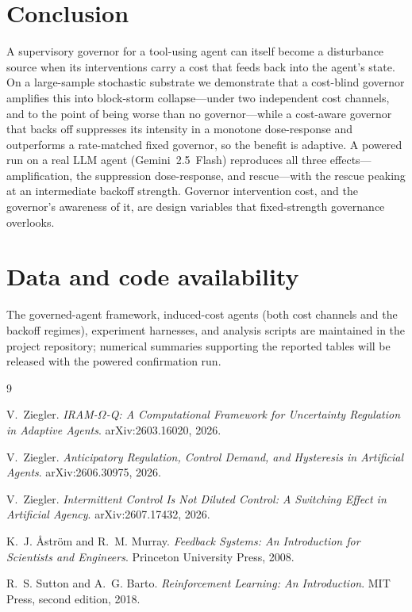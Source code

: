 \documentclass[11pt]{article}
\begin{document}
\section{Conclusion}

A supervisory governor for a tool-using agent can itself become a disturbance
source when its interventions carry a cost that feeds back into the agent's
state. On a large-sample stochastic substrate we demonstrate that a cost-blind
governor amplifies this into block-storm collapse---under two independent cost
channels, and to the point of being worse than no governor---while a cost-aware
governor that backs off suppresses its intensity in a monotone dose-response and
outperforms a rate-matched fixed governor, so the benefit is adaptive. A powered
run on a real LLM agent (Gemini~2.5~Flash) reproduces all three effects---%
amplification, the suppression dose-response, and rescue---with the rescue
peaking at an intermediate backoff strength. Governor intervention cost, and the
governor's awareness of it, are design variables that fixed-strength governance
overlooks.

\section*{Data and code availability}
The governed-agent framework, induced-cost agents (both cost channels and the
backoff regimes), experiment harnesses, and analysis scripts are maintained in
the project repository; numerical summaries supporting the reported tables will
be released with the powered confirmation run.

\begin{thebibliography}{9}

V.~Ziegler.
\newblock \emph{IRAM-$\Omega$-Q: A Computational Framework for Uncertainty
Regulation in Adaptive Agents}.
\newblock arXiv:2603.16020, 2026.

V.~Ziegler.
\newblock \emph{Anticipatory Regulation, Control Demand, and Hysteresis in
Artificial Agents}.
\newblock arXiv:2606.30975, 2026.

V.~Ziegler.
\newblock \emph{Intermittent Control Is Not Diluted Control: A Switching Effect
in Artificial Agency}.
\newblock arXiv:2607.17432, 2026.

K.~J. \r{A}str\"om and R.~M. Murray.
\newblock \emph{Feedback Systems: An Introduction for Scientists and Engineers}.
\newblock Princeton University Press, 2008.

R.~S. Sutton and A.~G. Barto.
\newblock \emph{Reinforcement Learning: An Introduction}.
\newblock MIT Press, second edition, 2018.

\end{thebibliography}
\end{document}
